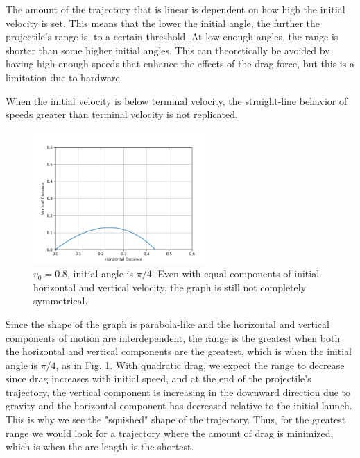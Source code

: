 \documentclass[12pt]{iopart} %
\begin{document}
The amount of the trajectory that is linear is dependent on how high the initial velocity is set.
This means that the lower the initial angle, the further the projectile's range is, to a certain threshold.
At low enough angles, the range is shorter than some higher initial angles.
This can theoretically be avoided by having high enough speeds that enhance the effects of the drag force, but this is a limitation due to hardware.

When the initial velocity is below terminal velocity, the straight-line behavior of speeds greater than terminal velocity is not replicated.

\begin{figure}[h!tbp]
  \begin{center}
 \item[]\includegraphics[width=0.6\textwidth]{figure8.png}
  \caption{\label{fig:figure8}
  $v_0 = 0.8$, initial angle is $\pi / 4$.
  Even with equal components of initial horizontal and vertical velocity, the graph is still not completely symmetrical.
  }
  \end{center}
\end{figure}

Since the shape of the graph is parabola-like and the horizontal and vertical components of motion are interdependent, the range is the greatest when both the horizontal and vertical components are the greatest, which is when the initial angle is $\pi / 4$, as in Fig. \ref{fig:figure8}.
With quadratic drag, we expect the range to decrease since drag increases with initial speed, and at the end of the projectile's trajectory, the vertical component is increasing in the downward direction due to gravity and the horizontal component has decreased relative to the initial launch.
This is why we see the "squished" shape of the trajectory.
Thus, for the greatest range we would look for a trajectory where the amount of drag is minimized, which is when the arc length is the shortest.
\end{document}
